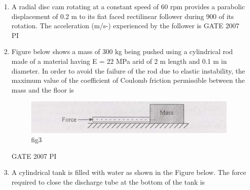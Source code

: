 \documentclass[journal,12pt,onecolumn]{IEEEtran}
\theoremstyle{remark}
\begin{document}
\begin{enumerate}
                    \item 
                    A radial disc cam rotating at a constant speed of 60 rpm provides a parabolic displacement of 0.2 m to its fiat faced rectilinear follower during 900 of its rotation. The acceleration (m/s-) experienced by the follower is
                    \hfill{GATE 2007 PI}
                    \begin{enumerate}
                    \end{enumerate}
                    
                    \item
                    Figure below shows a mass of 300 kg being pushed using a cylindrical rod made of a material having E = 22 MPa arid of 2 m length and 0.1 m in diameter. In order to avoid the failure of the rod due to elastic instability, the maximum value of the coefficient of Coulomb friction permissible between the mass and the floor is

    \begin{figure}[H]
        \centering
        \includegraphics[width=0.5\linewidth]{figs/Q.30.png}
        \caption{fig3}
        \label{fig:figs/Q.30.png}
    \end{figure}
                   \hfill{GATE 2007 PI}
\begin{enumerate}
\end{enumerate}

\item
A cylindrical tank is filled with water as shown in the Figure below. The force required to close the discharge tube at the bottom of the tank is


\end{enumerate}
\end{document}
